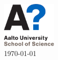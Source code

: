 \begin{titlepage}




\includegraphics[width=0.2\textwidth]{AaltoSCI_EN_9.pdf}\\[1cm] %
 


{\large \today}\\[2cm] %
\vfill %



\end{titlepage}




